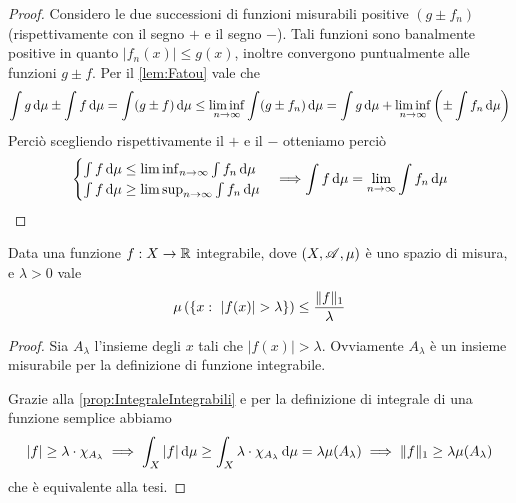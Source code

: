 \begin{proof}
	Considero le due successioni di funzioni misurabili positive $(g\pm f_n)$ (rispettivamente con il segno $+$ e il segno $-$). Tali funzioni sono banalmente positive in quanto $|f_n(x)|\le g(x)$, inoltre convergono puntualmente alle funzioni $g\pm f$. Per il \cref{lem:Fatou} vale che
	\begin{equation*}
		\int g\,\mathrm d\mu\pm\int f\,\mathrm d\mu=\int (g\pm f) \,\mathrm d\mu \le \liminf_{n\to\infty} \int (g\pm f_n) \,\mathrm d\mu=\int g\,\mathrm d\mu +\liminf_{n\to\infty}\left( \pm\int f_n \,\mathrm d \mu\right)
	\end{equation*}
	Perciò scegliendo rispettivamente il $+$ e il $-$ otteniamo perciò
	\begin{equation*}
		\begin{cases}
			\int f \,\mathrm d\mu\le \liminf_{n\to\infty}\int f_n \,\mathrm d \mu \\
			\int f\,\mathrm d\mu \ge \limsup_{n\to\infty}\int f_n \,\mathrm d \mu
		\end{cases}
		\Longrightarrow \int f\,\mathrm d\mu = \lim_{n\to\infty}\int f_n \,\mathrm d \mu
	\end{equation*}

\end{proof}

\begin{theorem}\label{thm:DisuguaglianzaChebyshev}
	Data una funzione $f:X\to\mathbb R$ integrabile, dove $(X,\mathscr A,\mu)$ è uno spazio di misura, e $\lambda>0$ vale
	\begin{equation*}
		\mu\left(\left\{x:\ |f(x)|>\lambda\right\}\right) \le \frac{\LNorm f}{\lambda}
	\end{equation*}
\end{theorem}
\begin{proof}
	Sia $A_\lambda$ l'insieme degli $x$ tali che $|f(x)|>\lambda$. Ovviamente $A_\lambda$ è un insieme misurabile per la definizione di funzione integrabile.
	
	Grazie alla \cref{prop:IntegraleIntegrabili} e per la definizione di integrale di una funzione semplice abbiamo
	\begin{equation*}
		|f|\ge\lambda \cdot \chi_{A_\lambda} \implies \int_X |f|\,\mathrm d\mu \ge \int_X \lambda\cdot\chi_{A_\lambda}\,\mathrm d\mu=\lambda\mu(A_\lambda)\implies
		\Vert f\Vert_1\ge \lambda\mu(A_\lambda)
	\end{equation*}
	che è equivalente alla tesi.
\end{proof}

